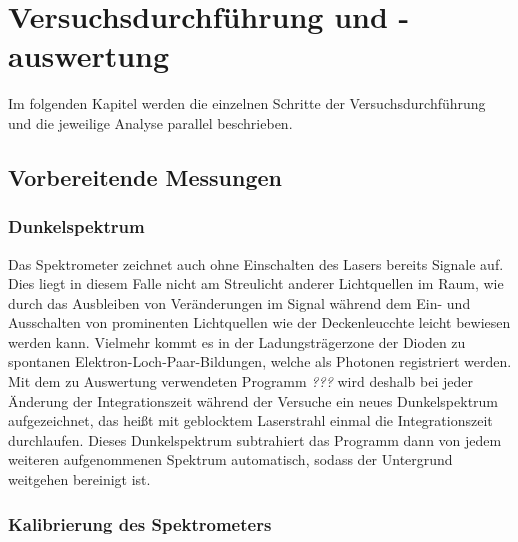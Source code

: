 \documentclass[../bericht.tex]{subfiles}
\begin{document}
  \chapter{Versuchsdurchführung und -auswertung}

    Im folgenden Kapitel werden die einzelnen Schritte der Versuchsdurchführung und die jeweilige Analyse parallel beschrieben.


    \section{Vorbereitende Messungen}


      \subsection{Dunkelspektrum}

        Das Spektrometer zeichnet auch ohne Einschalten des Lasers bereits Signale auf. Dies liegt in diesem Falle nicht am Streulicht anderer Lichtquellen im Raum, wie durch das Ausbleiben von Veränderungen im Signal während dem Ein- und Ausschalten von prominenten Lichtquellen wie der Deckenleucchte leicht bewiesen werden kann. Vielmehr kommt es in der Ladungsträgerzone der Dioden zu spontanen Elektron-Loch-Paar-Bildungen, welche als Photonen registriert werden. Mit dem zu Auswertung verwendeten Programm \textit{???} wird deshalb bei jeder Änderung der Integrationszeit während der Versuche ein neues Dunkelspektrum aufgezeichnet, das heißt mit geblocktem Laserstrahl einmal die Integrationszeit durchlaufen. Dieses Dunkelspektrum subtrahiert das Programm dann von jedem weiteren aufgenommenen Spektrum automatisch, sodass der Untergrund weitgehen bereinigt ist.


      \subsection{Kalibrierung des Spektrometers}
      \label{subsec:kalibrierung}
\end{document}
